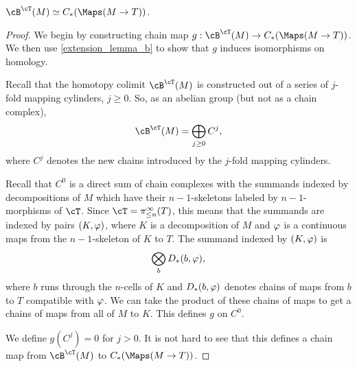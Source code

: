 \begin{thm} \label{thm:map-recon}
$\cB^\cT(M) \simeq C_*(\Maps(M\to T))$.
\end{thm}
\begin{proof}
We begin by constructing chain map $g: \cB^\cT(M) \to C_*(\Maps(M\to T))$.
We then use \ref{extension_lemma_b} to show that $g$ induces isomorphisms on homology.

Recall that the homotopy colimit $\cB^\cT(M)$ is constructed out of a series of
$j$-fold mapping cylinders, $j \ge 0$.
So, as an abelian group (but not as a chain complex), 
\[
	\cB^\cT(M) = \bigoplus_{j\ge 0} C^j,
\]
where $C^j$ denotes the new chains introduced by the $j$-fold mapping cylinders.

Recall that $C^0$ is a direct sum of chain complexes with the summands indexed by
decompositions of $M$ which have their $n{-}1$-skeletons labeled by $n{-}1$-morphisms
of $\cT$.
Since $\cT = \pi^\infty_{\leq n}(T)$, this means that the summands are indexed by pairs
$(K, \varphi)$, where $K$ is a decomposition of $M$ and $\varphi$ is a continuous
maps from the $n{-}1$-skeleton of $K$ to $T$.
The summand indexed by $(K, \varphi)$ is
\[
	\bigotimes_b D_*(b, \varphi),
\]
where $b$ runs through the $n$-cells of $K$ and $D_*(b, \varphi)$ denotes
chains of maps from $b$ to $T$ compatible with $\varphi$.
We can take the product of these chains of maps to get a chains of maps from
all of $M$ to $K$.
This defines $g$ on $C^0$.

We define $g(C^j) = 0$ for $j > 0$.
It is not hard to see that this defines a chain map from 
$\cB^\cT(M)$ to $C_*(\Maps(M\to T))$.








\end{proof}

